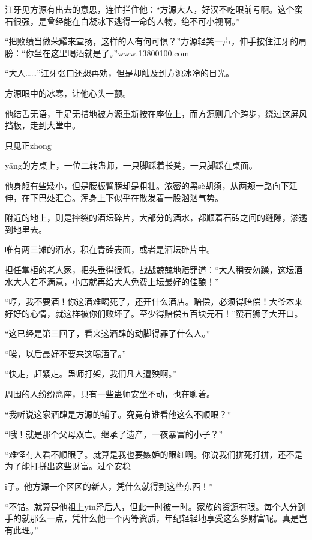 
\begin{this_body}

江牙见方源有出去的意思，连忙拦住他：“方源大人，好汉不吃眼前亏啊。这个蛮石很强，是曾经能在白凝冰下逃得一命的人物，绝不可小视啊。”

“把败绩当做荣耀来宣扬，这样的人有何可惧？”方源轻笑一声，伸手按住江牙的肩膀：“你坐在这里喝酒就是了。”www.13800100.com

“大人……”江牙张口还想再劝，但是却触及到方源冰冷的目光。

方源眼中的冰寒，让他心头一颤。

他结舌无语，手足无措地被方源重新按在座位上，而方源则几个跨步，绕过这屏风挡板，走到大堂中。

只见正zhong

yāng的方桌上，一位二转蛊师，一只脚踩着长凳，一只脚踩在桌面。

他身躯有些矮小，但是腰板臂膀却是粗壮。浓密的黑sè胡须，从两颊一路向下延伸，在下巴处汇合。浑身上下似乎在散发着一股汹汹气势。

附近的地上，则是摔裂的酒坛碎片，大部分的酒水，都顺着石砖之间的缝隙，渗透到地里去。

唯有两三滩的酒水，积在青砖表面，或者是酒坛碎片中。

担任掌柜的老人家，把头垂得很低，战战兢兢地赔罪道：“大人稍安勿躁，这坛酒水大人若不满意，小店就再给大人免费上坛最好的佳酿！”

“哼，我不要酒！你这酒难喝死了，还开什么酒店。赔偿，必须得赔偿！大爷本来好好的心情，就这样被你们败坏了。至少得赔偿五百块元石！”蛮石狮子大开口。

“这已经是第三回了，看来这酒肆的动脚得罪了什么人。”

“唉，以后最好不要来这喝酒了。”

“快走，赶紧走。蛊师打架，我们凡人遭殃啊。”

周围的人纷纷离座，只有一些蛊师安坐不动，也在聊着。

“我听说这家酒肆是方源的铺子。究竟有谁看他这么不顺眼？”

“哦！就是那个父母双亡。继承了遗产，一夜暴富的小子？”

“难怪有人看不顺眼了。就算是我也要嫉妒的眼红啊。你说我们拼死打拼，还不是为了能打拼出这些财富。过个安稳

i子。他方源一个区区的新人，凭什么就得到这些东西！”

“不错。就算是他祖上yin泽后人，但此一时彼一时。家族的资源有限。每个人分到手的就那么一点，凭什么他一个丙等资质，年纪轻轻地享受这么多财富呢。真是岂有此理。”


\end{this_body}
